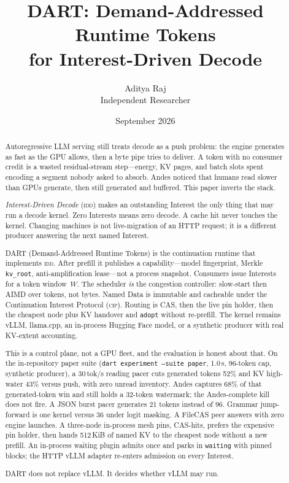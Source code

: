 \documentclass{article}
\title{DART: Demand-Addressed Runtime Tokens\\for Interest-Driven Decode}
\author{Aditya Raj\\Independent Researcher}
\date{September 2026}
\theoremstyle{definition}
\newcommand{\cip}{\textsc{cip}}
\newcommand{\idd}{\textsc{idd}}
\newcommand{\kvroot}{\texttt{kv\_root}}
\begin{document}
\maketitle

\begin{abstract}
Autoregressive LLM serving still treats decode as a push problem: the engine generates as fast as the GPU allows, then a byte pipe tries to deliver.
A token with no consumer credit is a wasted residual-stream step---energy, KV pages, and batch slots spent encoding a segment nobody asked to absorb.
Andes noticed that humans read slower than GPUs generate, then still generated and buffered.
This paper inverts the stack.

\emph{Interest-Driven Decode} (\idd{}) makes an outstanding Interest the only thing that may run a decode kernel.
Zero Interests means zero decode.
A cache hit never touches the kernel.
Changing machines is not live-migration of an HTTP request; it is a different producer answering the next named Interest.

DART (Demand-Addressed Runtime Tokens) is the continuation runtime that implements \idd{}.
After prefill it publishes a capability---model fingerprint, Merkle \kvroot{}, anti-amplification lease---not a process snapshot.
Consumers issue Interests for a token window~$W$.
The scheduler \emph{is} the congestion controller: slow-start then AIMD over tokens, not bytes.
Named Data is immutable and cacheable under the Continuation Interest Protocol (\cip{}).
Routing is CAS, then the live pin holder, then the cheapest node plus KV handover and \texttt{adopt} without re-prefill.
The kernel remains vLLM, llama.cpp, an in-process Hugging Face model, or a synthetic producer with real KV-extent accounting.

This is a control plane, not a GPU fleet, and the evaluation is honest about that.
On the in-repository paper suite (\texttt{dart experiment --suite paper}, 1.0\,s, 96-token cap, synthetic producer), a 30\,tok/s reading pacer cuts generated tokens 52\% and KV high-water 43\% versus push, with zero unread inventory.
Andes captures 68\% of that generated-token win and still holds a 32-token watermark; the Andes-complete kill does not fire.
A JSON burst pacer generates 21 tokens instead of 96.
Grammar jump-forward is one kernel versus 36 under logit masking.
A FileCAS peer answers with zero engine launches.
A three-node in-process mesh pins, CAS-hits, prefers the expensive pin holder, then hands 512\,KiB of named KV to the cheapest node without a new prefill.
An in-process waiting plugin admits once and parks in \texttt{waiting} with pinned blocks; the HTTP vLLM adapter re-enters admission on every Interest.

DART does not replace vLLM.
It decides whether vLLM may run.
\end{abstract}
\end{document}
